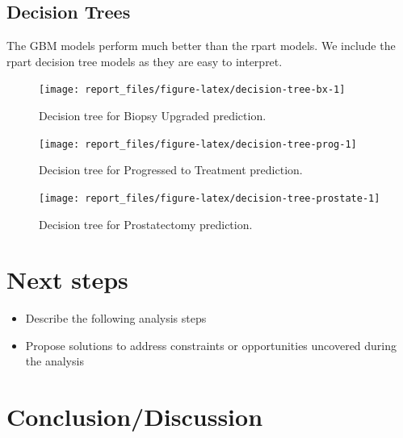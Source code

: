 \documentclass[]{article}
\def\tightlist{}
\begin{document}
\hypertarget{decision-trees}{%
\subsection{Decision Trees}\label{decision-trees}}

The GBM models perform much better than the rpart models.
We include the rpart decision tree models as they are easy to interpret.

\begin{figure}

{\centering \texttt{[image: report\_files/figure-latex/decision-tree-bx-1]} 

}

\caption{Decision tree for Biopsy Upgraded prediction.}\label{fig:decision-tree-bx}
\end{figure}

\begin{figure}

{\centering \texttt{[image: report\_files/figure-latex/decision-tree-prog-1]} 

}

\caption{Decision tree for Progressed to Treatment prediction.}\label{fig:decision-tree-prog}
\end{figure}

\begin{figure}

{\centering \texttt{[image: report\_files/figure-latex/decision-tree-prostate-1]} 

}

\caption{Decision tree for Prostatectomy prediction.}\label{fig:decision-tree-prostate}
\end{figure}

\hypertarget{next-steps}{%
\section{Next steps}\label{next-steps}}

\begin{itemize}
\tightlist
\item
  Describe the following analysis steps
\item
  Propose solutions to address constraints or opportunities uncovered during the analysis
\end{itemize}

\hypertarget{conclusiondiscussion}{%
\section{Conclusion/Discussion}\label{conclusiondiscussion}}
\end{document}

